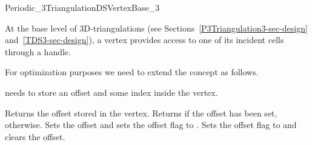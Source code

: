 

\begin{ccRefConcept}{Periodic_3TriangulationDSVertexBase_3}

\ccDefinition
  
At the base level of 3D-triangulations 
(see Sections~\ref{P3Triangulation3-sec-design} and~\ref{TDS3-sec-design}),
a vertex provides access to one of its incident cells through a handle.

For optimization purposes we need to extend the concept
 as follows.

\ccRefines {}

 needs to store an offset
and some index inside the vertex.

\ccTypes
{}



\ccAccessFunctions

{Returns the offset stored in the vertex.}
\ccGlue
{}
{Returns  if the offset has been set,  otherwise.}
\ccGlue
{}
{Sets the offset and sets the offset flag to .}
\ccGlue
{}
{Sets the offset flag to  and clears the offset.}

\ccHasModels


\ccSeeAlso

\\
\\



\end{ccRefConcept}
